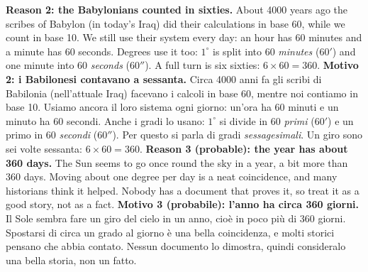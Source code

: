 \begin{bi}
\textbf{Reason 2: the Babylonians counted in sixties.} About 4000 years ago the scribes of Babylon (in today's Iraq) did their calculations in base 60, while we count in base 10. We still use their system every day: an hour has 60 minutes and a minute has 60 seconds. Degrees use it too: $1^\circ$ is split into 60 \emph{minutes} ($60'$) and one minute into 60 \emph{seconds} ($60''$). A full turn is six sixties: $6 \times 60 = 360$.
\IT
\textbf{Motivo 2: i Babilonesi contavano a sessanta.} Circa 4000 anni fa gli scribi di Babilonia (nell'attuale Iraq) facevano i calcoli in base 60, mentre noi contiamo in base 10. Usiamo ancora il loro sistema ogni giorno: un'ora ha 60 minuti e un minuto ha 60 secondi. Anche i gradi lo usano: $1^\circ$ si divide in 60 \emph{primi} ($60'$) e un primo in 60 \emph{secondi} ($60''$). Per questo si parla di gradi \emph{sessagesimali}. Un giro sono sei volte sessanta: $6 \times 60 = 360$.
\EN
\textbf{Reason 3 (probable): the year has about 360 days.} The Sun seems to go once round the sky in a year, a bit more than 360 days. Moving about one degree per day is a neat coincidence, and many historians think it helped. Nobody has a document that proves it, so treat it as a good story, not as a fact.
\IT
\textbf{Motivo 3 (probabile): l'anno ha circa 360 giorni.} Il Sole sembra fare un giro del cielo in un anno, cioè in poco più di 360 giorni. Spostarsi di circa un grado al giorno è una bella coincidenza, e molti storici pensano che abbia contato. Nessun documento lo dimostra, quindi consideralo una bella storia, non un fatto.
\end{bi}

